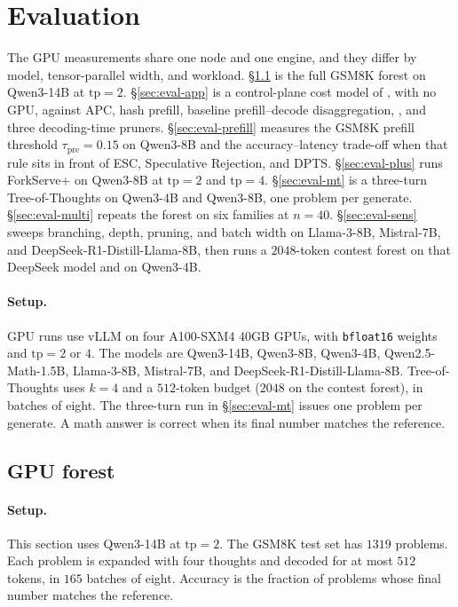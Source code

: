 \section{Evaluation}
\label{sec:eval}

The GPU measurements share one node and one engine, and they differ by model, tensor-parallel width, and workload.
\S\ref{sec:eval-gpu} is the full GSM8K forest on Qwen3-14B at $\mathrm{tp}{=}2$.
\S\ref{sec:eval-app} is a control-plane cost model of \app, with no GPU, against APC, hash prefill, baseline prefill--decode disaggregation, \sys, and three decoding-time pruners.
\S\ref{sec:eval-prefill} measures the GSM8K prefill threshold $\tau_{\mathrm{pre}}{=}0.15$ on Qwen3-8B and the accuracy--latency trade-off when that rule sits in front of ESC, Speculative Rejection, and DPTS.
\S\ref{sec:eval-plus} runs ForkServe+ on Qwen3-8B at $\mathrm{tp}{=}2$ and $\mathrm{tp}{=}4$.
\S\ref{sec:eval-mt} is a three-turn Tree-of-Thoughts on Qwen3-4B and Qwen3-8B, one problem per generate.
\S\ref{sec:eval-multi} repeats the forest on six families at $n{=}40$.
\S\ref{sec:eval-sens} sweeps branching, depth, pruning, and batch width on Llama-3-8B, Mistral-7B, and DeepSeek-R1-Distill-Llama-8B, then runs a $2048$-token contest forest on that DeepSeek model and on Qwen3-4B.

\paragraph{Setup.}
GPU runs use vLLM on four A100-SXM4 40GB GPUs, with \texttt{bfloat16} weights and $\mathrm{tp}{=}2$ or $4$.
The models are Qwen3-14B, Qwen3-8B, Qwen3-4B, Qwen2.5-Math-1.5B, Llama-3-8B, Mistral-7B, and DeepSeek-R1-Distill-Llama-8B.
Tree-of-Thoughts uses $k{=}4$ and a $512$-token budget ($2048$ on the contest forest), in batches of eight.
The three-turn run in \S\ref{sec:eval-mt} issues one problem per generate.
A math answer is correct when its final number matches the reference.

\subsection{GPU forest}
\label{sec:eval-gpu}

\paragraph{Setup.}
This section uses Qwen3-14B at $\mathrm{tp}{=}2$.
The GSM8K test set has $1319$ problems.
Each problem is expanded with four thoughts and decoded for at most $512$ tokens, in $165$ batches of eight.
Accuracy is the fraction of problems whose final number matches the reference.

